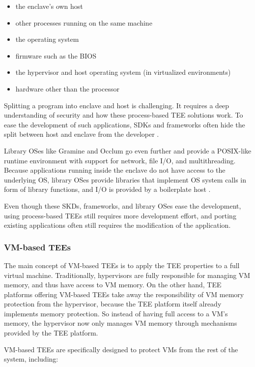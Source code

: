 \begin{itemize}
  \item the enclave's own host
  \item other processes running on the same machine
  \item the operating system
  \item firmware such as the BIOS
  \item the hypervisor and host operating system (in virtualized environments)
  \item hardware other than the processor
\end{itemize}

Splitting a program into enclave and host is challenging. It requires a deep
understanding of security and how these process-based TEE solutions work. To
ease the development of such applications, SDKs and frameworks often hide the
split between host and enclave from the developer \cite{schuster2022}.

Library OSes like Gramine and Occlum go even further and provide a POSIX-like
runtime environment with support for network, file I/O, and multithreading.
Because applications running inside the enclave do not have access to the
underlying OS, library OSes provide libraries that implement OS system calls in
form of library functions, and I/O is provided by a boilerplate host
\cite{tsai2014graphene}.

Even though these SKDs, frameworks, and library OSes ease the development, using
process-based TEEs still requires more development effort, and porting existing
applications often still requires the modification of the application.

\subsubsection{VM-based TEEs}
\label{sec:vm-based-tees}

The main concept of VM-based TEEs is to apply the TEE properties to a full
virtual machine. Traditionally, hypervisors are fully responsible for managing
VM memory, and thus have access to VM memory. On the other hand, TEE platforms
offering VM-based TEEs take away the responsibility of VM memory protection from
the hypervisor, because the TEE platform itself already implements memory
protection. So instead of having full access to a VM's memory, the hypervisor
now only manages VM memory through mechanisms provided by the TEE platform.

VM-based TEEs are specifically designed to protect VMs from the rest of the
system, including:


